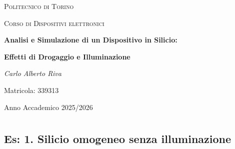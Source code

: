 \documentclass[a4paper,12pt]{report}
\begin{document}
\begin{titlepage}
    \centering
    {\scshape\LARGE Politecnico di Torino \par}
    \vspace{1cm}
    {\scshape\Large Corso di Dispositivi elettronici \par}
    \vspace{1.5cm}
    {\huge\bfseries Analisi e Simulazione di un Dispositivo in Silicio:\par}
    {\huge\bfseries Effetti di Drogaggio e Illuminazione \par}
    \vspace{2cm}
    {\Large\itshape Carlo Alberto Riva \par}
    {\large Matricola: 339313 \par}
    \vfill
    {\large Anno Accademico 2025/2026 \par}
\end{titlepage}

\chapter{}
\section{Es: 1. Silicio omogeneo senza illuminazione}
\end{document}
